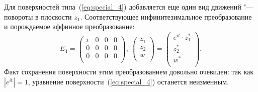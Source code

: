 \documentclass[../main.tex]{subfiles}
\begin{document}
Для поверхностей типа~(\ref{eq:special_4}) добавляется еще один вид движений "--- повороты в плоскости $z_1$. Соответствующее инфинитезимальное преобразование и порождаемое аффинное преобразование:
\begin{equation*}
E_4 = \left(
\begin{array}{cccc}
 i & 0 & 0 & 0 \\
 0 & 0 & 0 & 0 \\
 0 & 0 & 0 & 0 \\
\end{array}
\right),~
\left(
\begin{array}{c}
 z_1 \\
 z_2 \\
 w \\
\end{array}
\right) = 
\left(
\begin{array}{c}
 e^{it} \cdot z_1^* \\
 z_2^* \\
 w^* \\
\end{array}
\right).
\end{equation*}
Факт сохранения поверхности этим преобразованием довольно очевиден: так как $|e^{it}| = 1$, уравнение поверхности~(\ref{eq:special_4}) останется неизменным.
\end{document}
